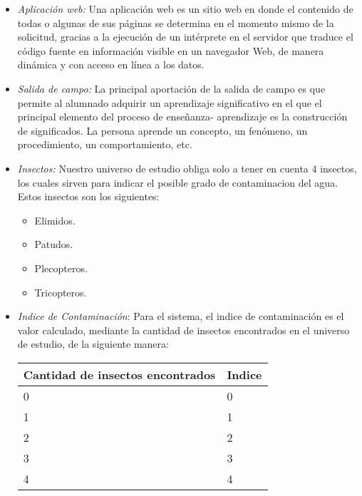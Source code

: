         \begin{itemize}
 
        \item \emph{Aplicación web:} Una aplicación web es un sitio web en donde el contenido de todas o algunas de sus páginas se determina en el momento mismo de la solicitud, gracias a la ejecución de un intérprete en el servidor que traduce el código fuente en información visible en un navegador Web, de manera dinámica y con acceso en línea a los datos.
 
        \item \emph{Salida de campo:} La principal aportación de la salida de campo es que permite al alumnado adquirir un aprendizaje significativo en el que el principal elemento del proceso de enseñanza- aprendizaje es la construcción de significados. La persona aprende un concepto, un fenómeno, un procedimiento, un comportamiento, etc.

        \item \emph{Insectos:} Nuestro universo de estudio obliga solo a tener en cuenta 4 insectos, los cuales sirven para indicar el posible grado de contaminacion del agua. Estos insectos son los siguientes:
            \begin{itemize}
                \item Elimidos.
                \item Patudos.
                \item Plecopteros.
                \item Tricopteros.
            \end{itemize}

        \item \emph{Indice de Contaminación}: Para el sistema, el indice de contaminación es el valor calculado, mediante la cantidad de insectos encontrados en el universo de estudio, de la siguiente manera:
        \begin{table}[H]
            \centering
            \begin{tabular}{|p{3.8cm}|l|}
                \hline
                \centering
                Cantidad de insectos encontrados  & Indice \\ \hline
                            0                     & 0 \\ \hline
                            1                     & 1 \\ \hline
                            2                     & 2 \\ \hline
                            3                     & 3 \\ \hline
                            4                     & 4 \\ 
                            \hline
            \end{tabular}
        \end{table}

        \end{itemize}

